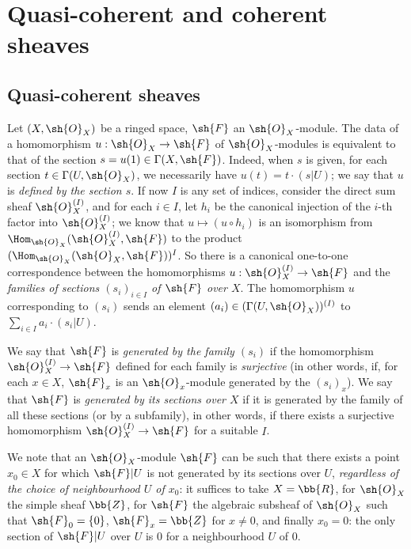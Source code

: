 \section{Quasi-coherent and coherent sheaves}
\label{section:0.5}

\subsection{Quasi-coherent sheaves}
\label{subsection:0.5.1}

\begin{env}[5.1.1]
\label{0.5.1.1}
Let $(X,\sh{O}_X)$ be a ringed space, $\sh{F}$ an $\sh{O}_X$-module.
The data of a homomorphism $u:\sh{O}_X\to\sh{F}$ of $\sh{O}_X$-modules is equivalent to that of the section $s=u(1)\in\Gamma(X,\sh{F})$.
Indeed, when $s$ is given, for each section $t\in\Gamma(U,\sh{O}_X)$, we necessarily have $u(t)=t\cdot(s|U)$;
we say that $u$ is \emph{defined by the section $s$}.
If now $I$ is any set of indices, consider the direct sum sheaf $\sh{O}_X^{(I)}$, and for each $i\in I$, let $h_i$ be the canonical injection of the $i$-th factor into $\sh{O}_X^{(I)}$;
we know that $u\mapsto(u\circ h_i)$ is an isomorphism from $\Hom_{\sh{O}_X}(\sh{O}_X^{(I)},\sh{F})$ to the product $(\Hom_{\sh{O}_X}(\sh{O}_X,\sh{F}))^I$.
So there is a canonical one-to-one correspondence between the homomorphisms $u:\sh{O}_X^{(I)}\to\sh{F}$ and the \emph{families of sections $(s_i)_{i\in I}$ of $\sh{F}$ over $X$}.
The homomorphism $u$ corresponding to $(s_i)$ sends an element $(a_i)\in(\Gamma(U,\sh{O}_X))^{(I)}$ to $\sum_{i\in I}a_i\cdot(s_i|U)$.

We say that $\sh{F}$ is \emph{generated by the family $(s_i)$} if the homomorphism $\sh{O}_X^{(I)}\to\sh{F}$ defined
for each family is \emph{surjective} (in other words, if, for each $x\in X$, $\sh{F}_x$ is an $\sh{O}_x$-module generated by the $(s_i)_x$).
We say that $\sh{F}$ is \emph{generated by its sections over $X$} if it is generated by the family of all these sections (or by a subfamily), in other words, if there exists a surjective homomorphism $\sh{O}_X^{(I)}\to\sh{F}$ for a suitable $I$.

We note that an $\sh{O}_X$-module $\sh{F}$ can be such that there exists a point $x_0\in X$ for which $\sh{F}|U$ is not generated by its sections over $U$, \emph{regardless of the choice of neighbourhood $U$ of $x_0$}:
it suffices to take $X=\bb{R}$, for $\sh{O}_X$ the simple sheaf $\bb{Z}$, for $\sh{F}$ the algebraic subsheaf of $\sh{O}_X$ such that $\sh{F}_0=\{0\}$, $\sh{F}_x=\bb{Z}$ for $x\neq 0$, and finally $x_0=0$:
the only section of $\sh{F}|U$ over $U$ is $0$ for a neighbourhood $U$ of $0$.
\end{env}

